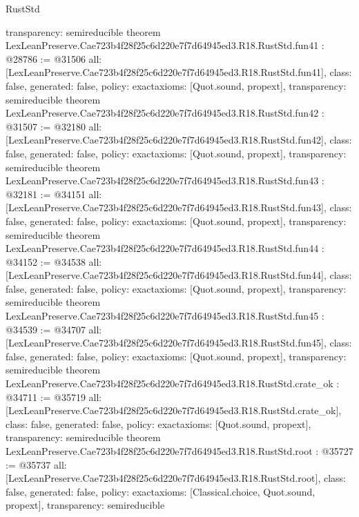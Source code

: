 \begin{lexlean}{RustStd}
\begin{coremodule}
{  transparency: semireducible
}
theorem LexLeanPreserve.Cae723b4f28f25c6d220e7f7d64945ed3.R18.RustStd.fun41 : @28786 := @31506 {
  all: [LexLeanPreserve.Cae723b4f28f25c6d220e7f7d64945ed3.R18.RustStd.fun41],
  class: false,
  generated: false,
  policy: exact{axioms: [Quot.sound, propext]},
  transparency: semireducible
}
theorem LexLeanPreserve.Cae723b4f28f25c6d220e7f7d64945ed3.R18.RustStd.fun42 : @31507 := @32180 {
  all: [LexLeanPreserve.Cae723b4f28f25c6d220e7f7d64945ed3.R18.RustStd.fun42],
  class: false,
  generated: false,
  policy: exact{axioms: [Quot.sound, propext]},
  transparency: semireducible
}
theorem LexLeanPreserve.Cae723b4f28f25c6d220e7f7d64945ed3.R18.RustStd.fun43 : @32181 := @34151 {
  all: [LexLeanPreserve.Cae723b4f28f25c6d220e7f7d64945ed3.R18.RustStd.fun43],
  class: false,
  generated: false,
  policy: exact{axioms: [Quot.sound, propext]},
  transparency: semireducible
}
theorem LexLeanPreserve.Cae723b4f28f25c6d220e7f7d64945ed3.R18.RustStd.fun44 : @34152 := @34538 {
  all: [LexLeanPreserve.Cae723b4f28f25c6d220e7f7d64945ed3.R18.RustStd.fun44],
  class: false,
  generated: false,
  policy: exact{axioms: [Quot.sound, propext]},
  transparency: semireducible
}
theorem LexLeanPreserve.Cae723b4f28f25c6d220e7f7d64945ed3.R18.RustStd.fun45 : @34539 := @34707 {
  all: [LexLeanPreserve.Cae723b4f28f25c6d220e7f7d64945ed3.R18.RustStd.fun45],
  class: false,
  generated: false,
  policy: exact{axioms: [Quot.sound, propext]},
  transparency: semireducible
}
theorem LexLeanPreserve.Cae723b4f28f25c6d220e7f7d64945ed3.R18.RustStd.crate_ok : @34711 := @35719 {
  all: [LexLeanPreserve.Cae723b4f28f25c6d220e7f7d64945ed3.R18.RustStd.crate_ok],
  class: false,
  generated: false,
  policy: exact{axioms: [Quot.sound, propext]},
  transparency: semireducible
}
theorem LexLeanPreserve.Cae723b4f28f25c6d220e7f7d64945ed3.R18.RustStd.root : @35727 := @35737 {
  all: [LexLeanPreserve.Cae723b4f28f25c6d220e7f7d64945ed3.R18.RustStd.root],
  class: false,
  generated: false,
  policy: exact{axioms: [Classical.choice, Quot.sound, propext]},
  transparency: semireducible
}


\end{coremodule}
\end{lexlean}
